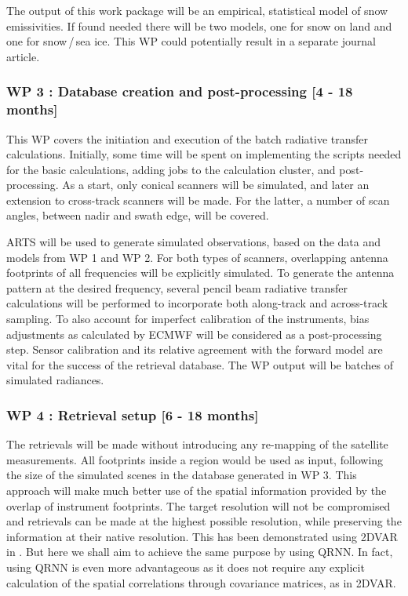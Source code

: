 \documentclass[12pt,oneside,a4paper]{article}
\begin{document}
The output of this work package will be an empirical, statistical model of
snow emissivities. If found needed there will be two models, one for snow on
land and one for snow\,/\,sea ice. This WP could potentially result in a separate
journal article.
\vspace{-1.0ex}

\subsubsection*{WP 3 : Database creation and post-processing [4 - 18 months]}
%
\label{sec:database}	
This WP covers the initiation and execution of the batch radiative
transfer calculations. Initially, some time will be spent on implementing the
scripts needed for the basic calculations, adding jobs to the calculation
cluster, and post-processing. As a start, only conical scanners will be
simulated, and later an extension to cross-track scanners will be made. For the
latter, a number of scan angles, between nadir and swath edge, will be covered.

ARTS will be used to generate simulated observations, based on the data and
models from WP 1 and WP 2. For both types of scanners, overlapping antenna
footprints of all frequencies will be explicitly simulated. To generate the
antenna pattern at the desired frequency, several pencil beam radiative
transfer calculations will be performed to incorporate both along-track and
across-track sampling. To also account for imperfect calibration of the
instruments, bias adjustments as calculated by ECMWF will be considered as a
post-processing step. Sensor calibration and its relative agreement with the
forward model are vital for the success of the retrieval database. The WP
output will be batches of simulated radiances.  \vspace{-1.0ex}


\subsubsection*{WP 4 : Retrieval setup [6 - 18 months]}
%
\label{sec:setup}
The retrievals will be made without introducing any re-mapping of the satellite
measurements. All footprints inside a region would be used as input, following
the size of the simulated scenes in the database generated in WP 3. This
approach will make much better use of the spatial information provided by the
overlap of instrument footprints. The target resolution will not be
compromised and retrievals can be made at the highest possible resolution,
while preserving the information at their native resolution. This has been
demonstrated using 2DVAR in \citet{duncan:anexp:19}. But here we shall aim to
achieve the same purpose by using QRNN. In fact, using QRNN is even more advantageous as it does not require any explicit calculation of the spatial correlations through covariance matrices, as in 2DVAR.
\end{document}
